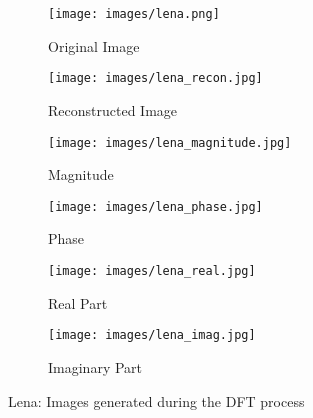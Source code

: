 \begin{figure}[htbp]
    \centering 
    \begin{minipage}{0.8\textwidth} 
        \centering 
        
        \begin{subfigure}[b]{0.45\linewidth} 
            \texttt{[image: images/lena.png]}
            \caption{Original Image}
        \end{subfigure}
        \hfill
        \begin{subfigure}[b]{0.45\linewidth}
            \texttt{[image: images/lena\_recon.jpg]}
            \caption{Reconstructed Image}
        \end{subfigure}

        \vspace{0.5cm}
        \begin{subfigure}[b]{0.45\linewidth}
            \texttt{[image: images/lena\_magnitude.jpg]}
            \caption{Magnitude}
        \end{subfigure}
        \hfill
        \begin{subfigure}[b]{0.45\linewidth}
            \texttt{[image: images/lena\_phase.jpg]}
            \caption{Phase}
        \end{subfigure}

        \vspace{0.5cm}
        \begin{subfigure}[b]{0.45\linewidth}
            \texttt{[image: images/lena\_real.jpg]}
            \caption{Real Part}
        \end{subfigure}
        \hfill
        \begin{subfigure}[b]{0.45\linewidth}
            \texttt{[image: images/lena\_imag.jpg]}
            \caption{Imaginary Part}
        \end{subfigure}

        \caption{Lena: Images generated during the DFT process}
        \label{fig:lena_1}
    \end{minipage}
\end{figure}

